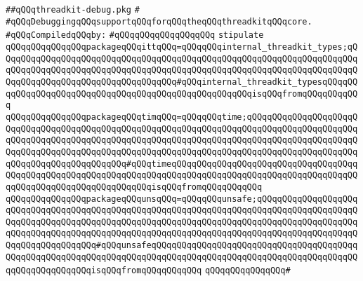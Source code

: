 \label{src/lib/src/lib/thread-kit/src/core-thread-kit/threadkit-debug.pkg}
\verb|##qQQqthreadkit-debug.pkg|\newline
\verb|#|\newline
\verb|#qQQqDebuggingqQQqsupportqQQqforqQQqtheqQQqthreadkitqQQqcore.|\newline
\newline
\verb|#qQQqCompiledqQQqby:|\newline
\verb|#qQQqqQQqqQQqqQQqqQQq|\newline
\newline
\newline
\newline
\verb|stipulate|\newline
\verb|qQQqqQQqqQQqqQQqpackageqQQqittqQQq=qQQqqQQqinternal_threadkit_types;qQQqqQQqqQQqqQQqqQQqqQQqqQQqqQQqqQQqqQQqqQQqqQQqqQQqqQQqqQQqqQQqqQQqqQQqqQQqqQQqqQQqqQQqqQQqqQQqqQQqqQQqqQQqqQQqqQQqqQQqqQQqqQQqqQQqqQQqqQQqqQQqqQQqqQQqqQQqqQQqqQQqqQQqqQQqqQQq#qQQqinternal_threadkit_typesqQQqqQQqqQQqqQQqqQQqqQQqqQQqqQQqqQQqqQQqqQQqqQQqqQQqqQQqisqQQqfromqQQqqQQqqQQq|\newline
\verb|qQQqqQQqqQQqqQQqpackageqQQqtimqQQq=qQQqqQQqtime;qQQqqQQqqQQqqQQqqQQqqQQqqQQqqQQqqQQqqQQqqQQqqQQqqQQqqQQqqQQqqQQqqQQqqQQqqQQqqQQqqQQqqQQqqQQqqQQqqQQqqQQqqQQqqQQqqQQqqQQqqQQqqQQqqQQqqQQqqQQqqQQqqQQqqQQqqQQqqQQqqQQqqQQqqQQqqQQqqQQqqQQqqQQqqQQqqQQqqQQqqQQqqQQqqQQqqQQqqQQqqQQqqQQqqQQqqQQqqQQqqQQqqQQqqQQqqQQq#qQQqtimeqQQqqQQqqQQqqQQqqQQqqQQqqQQqqQQqqQQqqQQqqQQqqQQqqQQqqQQqqQQqqQQqqQQqqQQqqQQqqQQqqQQqqQQqqQQqqQQqqQQqqQQqqQQqqQQqqQQqqQQqqQQqqQQqqQQqqQQqisqQQqfromqQQqqQQqqQQq|\newline
\verb|qQQqqQQqqQQqqQQqpackageqQQqunsqQQq=qQQqqQQqunsafe;qQQqqQQqqQQqqQQqqQQqqQQqqQQqqQQqqQQqqQQqqQQqqQQqqQQqqQQqqQQqqQQqqQQqqQQqqQQqqQQqqQQqqQQqqQQqqQQqqQQqqQQqqQQqqQQqqQQqqQQqqQQqqQQqqQQqqQQqqQQqqQQqqQQqqQQqqQQqqQQqqQQqqQQqqQQqqQQqqQQqqQQqqQQqqQQqqQQqqQQqqQQqqQQqqQQqqQQqqQQqqQQqqQQqqQQqqQQqqQQqqQQqqQQq#qQQqunsafeqQQqqQQqqQQqqQQqqQQqqQQqqQQqqQQqqQQqqQQqqQQqqQQqqQQqqQQqqQQqqQQqqQQqqQQqqQQqqQQqqQQqqQQqqQQqqQQqqQQqqQQqqQQqqQQqqQQqqQQqqQQqqQQqisqQQqfromqQQqqQQqqQQq|\newline
\verb|qQQqqQQqqQQqqQQq#|\newline
